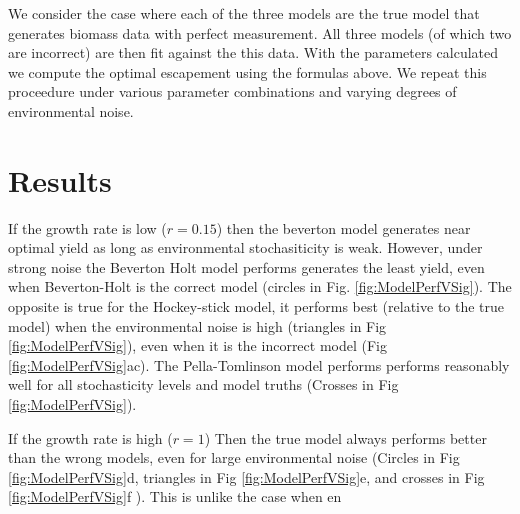 \documentclass[]{elsarticle} %
\begin{document}
We consider the case where each of the three models are the true model that generates biomass data with perfect measurement. All three models (of which two are incorrect) are then fit against the this data. With the parameters calculated we compute the optimal escapement using the formulas above. We repeat this proceedure under various parameter combinations and varying degrees of environmental noise.

\section{Results}

If the growth rate is low ($r=0.15$) then the beverton model generates near optimal yield as long as environmental stochasiticity is weak. However, under strong noise the Beverton Holt model performs generates the least yield, even when Beverton-Holt is the correct model (circles in Fig. \ref{fig:ModelPerfVSig}). The opposite is true for the Hockey-stick model, it performs best (relative to the true model) when the environmental noise is high (triangles in Fig \ref{fig:ModelPerfVSig}), even when it is the incorrect model (Fig \ref{fig:ModelPerfVSig}ac). The Pella-Tomlinson model performs performs reasonably well for all stochasticity levels and model truths (Crosses in Fig \ref{fig:ModelPerfVSig}).

If the growth rate is high ($r=1$) Then the true model always performs better than the wrong models, even for large environmental noise (Circles in Fig \ref{fig:ModelPerfVSig}d, triangles in Fig \ref{fig:ModelPerfVSig}e, and crosses in Fig \ref{fig:ModelPerfVSig}f ). This is unlike the case when en 
\end{document}
